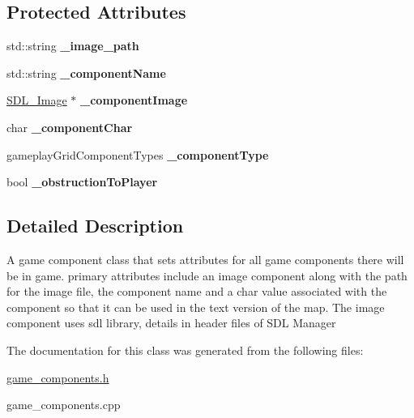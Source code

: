 \subsection*{Protected Attributes}
\begin{DoxyCompactItemize}
\item 
\hypertarget{class_game_component_a87432810a6a4a93719f07cdafa640e37}{}\label{class_game_component_a87432810a6a4a93719f07cdafa640e37} 
std\+::string {\bfseries \+\_\+image\+\_\+path}
\item 
\hypertarget{class_game_component_ade1534e7983554793fd5da171cafbdff}{}\label{class_game_component_ade1534e7983554793fd5da171cafbdff} 
std\+::string {\bfseries \+\_\+component\+Name}
\item 
\hypertarget{class_game_component_af705fa08c5b6f3747b79758c595e7fed}{}\label{class_game_component_af705fa08c5b6f3747b79758c595e7fed} 
\hyperlink{class_s_d_l___image}{S\+D\+L\+\_\+\+Image} $\ast$ {\bfseries \+\_\+component\+Image}
\item 
\hypertarget{class_game_component_a8c602a32c902b21a8a30e8156c49e34c}{}\label{class_game_component_a8c602a32c902b21a8a30e8156c49e34c} 
char {\bfseries \+\_\+component\+Char}
\item 
\hypertarget{class_game_component_a3d62d2fb994d69c1c55ed83e4d9506c4}{}\label{class_game_component_a3d62d2fb994d69c1c55ed83e4d9506c4} 
gameplay\+Grid\+Component\+Types {\bfseries \+\_\+component\+Type}
\item 
\hypertarget{class_game_component_aad2dc6eb1db96a5e03faedcbaeabbb4e}{}\label{class_game_component_aad2dc6eb1db96a5e03faedcbaeabbb4e} 
bool {\bfseries \+\_\+obstruction\+To\+Player}
\end{DoxyCompactItemize}


\subsection{Detailed Description}
A game component class that sets attributes for all game components there will be in game. primary attributes include an image component along with the path for the image file, the component name and a char value associated with the component so that it can be used in the text version of the map. The image component uses sdl library, details in header files of S\+DL Manager 

The documentation for this class was generated from the following files\+:\begin{DoxyCompactItemize}
\item 
\hyperlink{game__components_8h}{game\+\_\+components.\+h}\item 
game\+\_\+components.\+cpp\end{DoxyCompactItemize}
